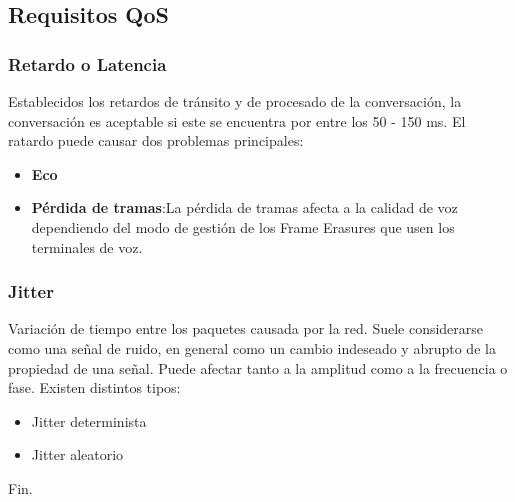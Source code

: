 \documentclass{beamer}
\begin{document}
\subsection{Requisitos QoS}
\begin{frame}
\frametitle{Retardo o Latencia}
		Establecidos los retardos de tránsito y de procesado de la conversación, la conversación es aceptable si este se encuentra por entre los 50 - 150 ms. 
		El ratardo puede causar dos problemas principales:
			\begin{itemize}
				\item \textbf{Eco}
				\item \textbf{Pérdida de tramas}:La pérdida de tramas afecta a la calidad de voz dependiendo del modo de gestión de los Frame Erasures que usen los terminales de voz.
			\end{itemize}
\end{frame}
\begin{frame}
\frametitle{Jitter}
			Variación de tiempo entre los paquetes causada por la red. Suele considerarse como una señal de ruido, en general como un cambio indeseado y abrupto de la propiedad de una señal. Puede afectar tanto a la amplitud como a la frecuencia o fase.
			Existen distintos tipos:
				\begin{itemize}
				\item Jitter determinista
				\item Jitter aleatorio
				\end{itemize}
\end{frame}

\begin{frame}
\Huge{\centerline{Fin.}}
\end{frame}

\end{document}
